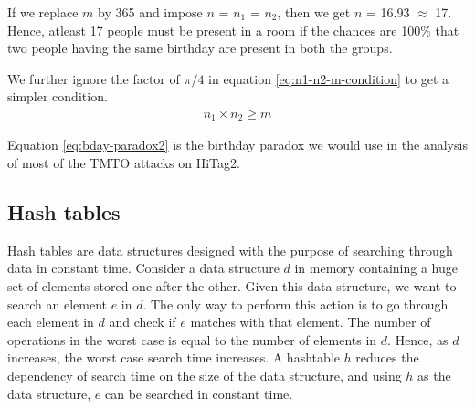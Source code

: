 If we replace $m$ by 365 and impose $n$ = $n_1$ = $n_2$, then we get $n$ = 16.93 $\approx$ 17. Hence, atleast 17 people must be present in a room if the chances are 100\% that two people having the same birthday are present in both the groups. 

We further ignore the factor of $\pi/4$ in equation \ref{eq:n1-n2-m-condition} to get a simpler condition.  
\begin{align}
\label{eq:bday-paradox2} n_1 \times n_2 \geq m
\end{align}

Equation \ref{eq:bday-paradox2} is the birthday paradox we would use in the analysis of most of the TMTO attacks on HiTag2.








\subsection{Hash tables}
\label{sec:hash-tables}



Hash tables are data structures designed with the purpose of searching through data in constant time. Consider a data structure $d$ in memory containing a huge set of elements stored one after the other. Given this data structure, we want to search an element $e$ in $d$. The only way to perform this action is to go through each element in $d$ and check if $e$ matches with that element. The number of operations in the worst case is equal to the number of elements in $d$. Hence, as $d$ increases, the worst case search time increases. A hashtable $h$ reduces the dependency of search time on the size of the data structure, and using $h$ as the data structure, $e$ can be searched in constant time.


